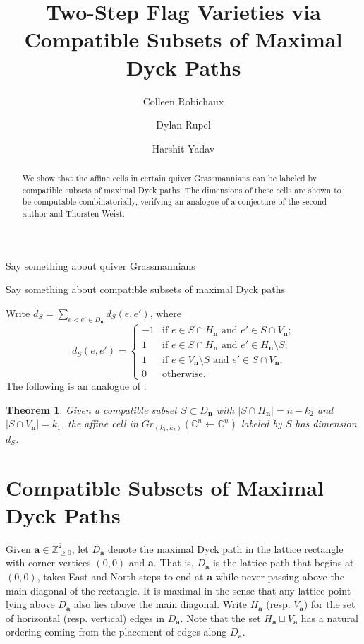 \documentclass{amsart}
\title{Two-Step Flag Varieties via\\ Compatible Subsets of Maximal Dyck Paths}
\author{Colleen Robichaux}
\author{Dylan Rupel}
\author{Harshit Yadav}
\newtheorem{thm}{Theorem}
\newcommand{\CC}{\mathbb{C}}
\newcommand{\ZZ}{\mathbb{Z}}
\newcommand{\bfa}{\mathbf{a}}
\newcommand{\bfn}{\mathbf{n}}
\begin{document}
  \begin{abstract}
    We show that the affine cells in certain quiver Grassmannians can be labeled by compatible subsets of maximal Dyck paths.
    The dimensions of these cells are shown to be computable combinatorially, verifying an analogue of a conjecture of the second author and Thorsten Weist.
  \end{abstract}
  \maketitle

  Say something about quiver Grassmannians

  Say something about compatible subsets of maximal Dyck paths

  Write $d_S=\sum\limits_{e<e'\in D_\bfn} d_S(e,e')$, where
  \[
    d_S(e,e')=
    \begin{cases}
      -1 & \text{if $e\in S\cap H_\bfn$ and $e'\in S\cap V_\bfn$;}\\
      1 & \text{if $e\in S\cap H_\bfn$ and $e'\in H_\bfn\setminus S$;}\\
      1 & \text{if $e\in V_\bfn\setminus S$ and $e'\in S\cap V_\bfn$;}\\
      0 & \text{otherwise.}
    \end{cases}
  \]
  The following is an analogue of \cite[Conjecture 5.21]{rupel-weist}.
  \begin{thm}
    Given a compatible subset $S\subset D_\bfn$ with $|S\cap H_\bfn|=n-k_2$ and $|S\cap V_\bfn|=k_1$, the affine cell in $Gr_{(k_1,k_2)}(\CC^n\leftarrow\CC^n)$ labeled by $S$ has dimension $d_S$.
  \end{thm}

  \section{Compatible Subsets of Maximal Dyck Paths}
  Given $\bfa\in\ZZ_{\ge0}^2$, let $D_\bfa$ denote the maximal Dyck path in the lattice rectangle with corner vertices $(0,0)$ and $\bfa$.
  That is, $D_\bfa$ is the lattice path that begins at $(0,0)$, takes East and North steps to end at $\bfa$ while never passing above the main diagonal of the rectangle.
  It is maximal in the sense that any lattice point lying above $D_\bfa$ also lies above the main diagonal.
  Write $H_\bfa$ (resp. $V_\bfa$) for the set of horizontal (resp. vertical) edges in $D_\bfa$.
  Note that the set $H_\bfa\sqcup V_\bfa$ has a natural ordering coming from the placement of edges along $D_\bfa$. 
\end{document}
